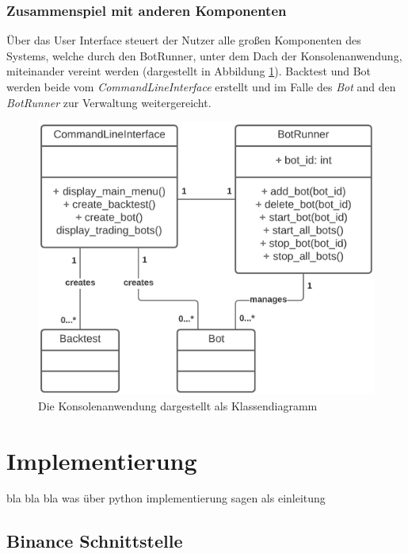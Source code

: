 \documentclass[oneside]{ausarbeitung}
\begin{document}
\subsection{Zusammenspiel mit anderen Komponenten}
\label{sub:zusammenspiel_mit_anderen_komponenten}


Über das User Interface steuert der Nutzer alle großen Komponenten des Systems, welche durch den BotRunner, unter dem Dach der Konsolenanwendung, miteinander vereint werden (dargestellt in Abbildung \ref{fig:15}). Backtest und Bot werden beide vom \textit{CommandLineInterface} erstellt und im Falle des \textit{Bot} and den \textit{BotRunner} zur Verwaltung weitergereicht.

\begin{figure}[H]
  \centering
  \includegraphics[height=0.42\textheight]{uml/cli_uml.png}
  \caption{Die Konsolenanwendung dargestellt als Klassendiagramm}
  \label{fig:15}
\end{figure}

\chapter{Implementierung}
\label{cha:implementierung}

bla bla bla was über python implementierung sagen als einleitung


\section{Binance Schnittstelle}
\label{sec:binance_schnittstelle}
\end{document}

